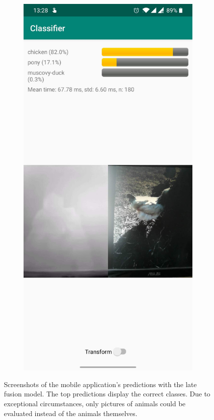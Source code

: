 \documentclass{l4proj}
\begin{document}
\begin{figure}[ht]
\begin{subfigure}[h!]{0.3\textwidth}
  \end{subfigure}
  \begin{subfigure}[h!]{0.3\textwidth}
    \includegraphics[width=\textwidth, trim={0cm, 22cm, 0cm, 0cm}, clip]{images/app/screenshot_2.jpg}
  \end{subfigure}
  \caption{Screenshots of the mobile application's predictions with the late fusion model. The top predictions display the correct classes. Due to exceptional circumstances, only pictures of animals could be evaluated instead of the animals themselves.}
  \label{fig:app_screenshots}
\end{figure}
\end{document}
